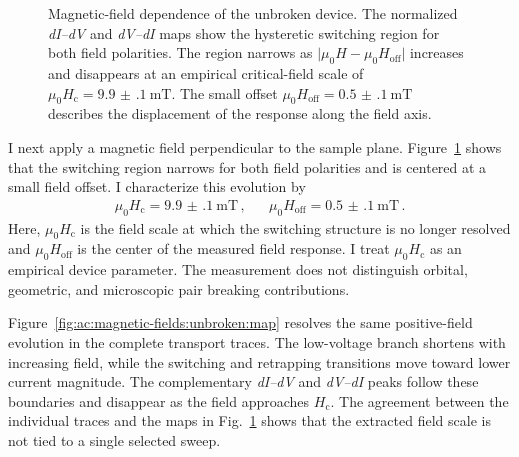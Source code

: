         \begin{figure}[t]
            \centering
            \hfill
            \caption{
                Magnetic-field dependence of the unbroken device. The normalized \textit{dI--dV} and \textit{dV--dI} maps show the hysteretic switching region for both field polarities. The region narrows as $\lvert\mu_0H-\mu_0H_\mathrm{off}\rvert$ increases and disappears at an empirical critical-field scale of $\mu_0H_\mathrm{c}=\qty{9.9(1)}{\milli\tesla}$. The small offset $\mu_0H_\mathrm{off}=\qty{0.5(1)}{\milli\tesla}$ describes the displacement of the response along the field axis.
                }
            \label{fig:ac:magnetic-fields:unbroken}
        \end{figure}

        I next apply a magnetic field perpendicular to the sample plane. Figure~\ref{fig:ac:magnetic-fields:unbroken} shows that the switching region narrows for both field polarities and is centered at a small field offset. I characterize this evolution by
        \begin{align}
            \mu_0H_\mathrm{c} = \qty{9.9(1)}{\milli\tesla}\,, &&
            \mu_0H_\mathrm{off} = \qty{0.5(1)}{\milli\tesla}\,.
            \label{eq:ac:unbroken:field}
        \end{align}
        Here, $\mu_0H_\mathrm{c}$ is the field scale at which the switching structure is no longer resolved and $\mu_0H_\mathrm{off}$ is the center of the measured field response. I treat $\mu_0H_\mathrm{c}$ as an empirical device parameter. The measurement does not distinguish orbital, geometric, and microscopic pair breaking contributions.

        Figure~\ref{fig:ac:magnetic-fields:unbroken:map} resolves the same positive-field evolution in the complete transport traces. The low-voltage branch shortens with increasing field, while the switching and retrapping transitions move toward lower current magnitude. The complementary \textit{dI--dV} and \textit{dV--dI} peaks follow these boundaries and disappear as the field approaches $H_\mathrm{c}$. The agreement between the individual traces and the maps in Fig.~\ref{fig:ac:magnetic-fields:unbroken} shows that the extracted field scale is not tied to a single selected sweep.

